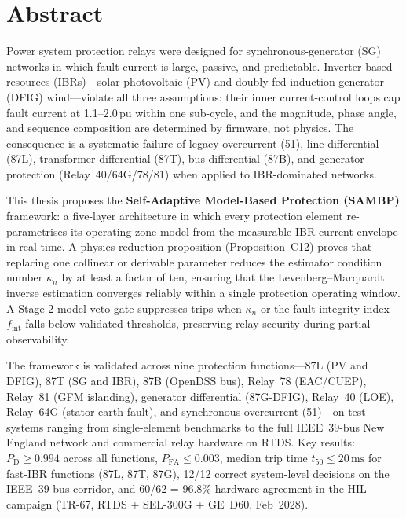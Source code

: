 \documentclass
    [phd,synopsis]
    {iitmdissertation}
\newcommand{\SAMBP}{\textsc{SAMBP}}
\newcommand{\ms}{\,\text{ms}}
\newcommand{\PD}{P_{\mathrm{D}}}
\newcommand{\PFA}{P_{\mathrm{FA}}}
\newcommand{\kn}{\kappa_n}
\begin{document}
\prematter

\section{Abstract}

Power system protection relays were designed for synchronous-generator (SG)
networks in which fault current is large, passive, and predictable.
Inverter-based resources (IBRs)---solar photovoltaic (PV) and
doubly-fed induction generator (DFIG) wind---violate all three assumptions:
their inner current-control loops cap fault current at 1.1--2.0\,pu within
one sub-cycle, and the magnitude, phase angle, and sequence composition
are determined by firmware, not physics.
The consequence is a systematic failure of legacy overcurrent (51), line
differential (87L), transformer differential (87T), bus differential (87B),
and generator protection (Relay~40/64G/78/81) when applied to IBR-dominated
networks.

This thesis proposes the \textbf{Self-Adaptive Model-Based Protection
(\SAMBP)} framework: a five-layer architecture in which every protection
element re-parametrises its operating zone model from the measurable IBR
current envelope in real time.
A physics-reduction proposition (Proposition~C12) proves that replacing one
collinear or derivable parameter reduces the estimator condition number
$\kn$ by at least a factor of ten, ensuring that the Levenberg--Marquardt
inverse estimation converges reliably within a single protection operating
window.
A Stage-2 model-veto gate suppresses trips when $\kn$ or the fault-integrity
index $f_{\mathrm{int}}$ falls below validated thresholds, preserving relay
security during partial observability.

The framework is validated across nine protection functions---87L (PV and DFIG),
87T (SG and IBR), 87B (OpenDSS bus), Relay~78 (EAC/CUEP), Relay~81 (GFM
islanding), generator differential (87G-DFIG), Relay~40 (LOE), Relay~64G
(stator earth fault), and synchronous overcurrent (51)---on test systems
ranging from single-element benchmarks to the full IEEE~39-bus New England
network and commercial relay hardware on RTDS.
Key results: $\PD \geq 0.994$ across all functions,
$\PFA \leq 0.003$, median trip time $t_{50} \leq 20\ms$ for fast-IBR
functions (87L, 87T, 87G), 12/12 correct system-level decisions on the
IEEE~39-bus corridor, and 60/62 = 96.8\% hardware agreement in the
HIL campaign (TR-67, RTDS + SEL-300G + GE~D60, Feb~2028).
\end{document}
